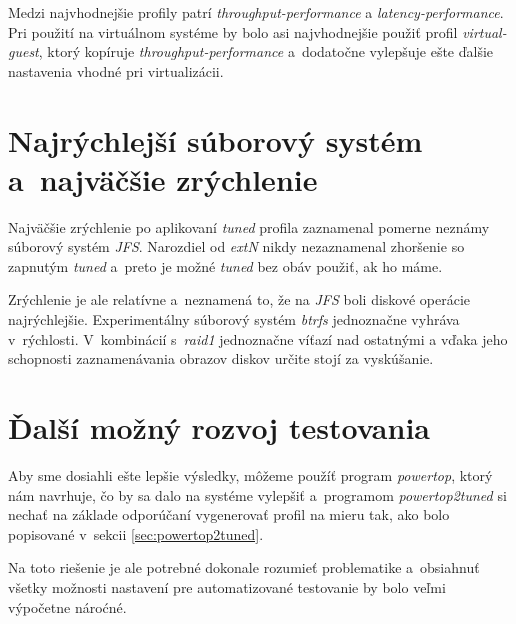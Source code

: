 Medzi najvhodnejšie profily patrí \emph{throughput-performance} a
\emph{latency-performance}. Pri použití na virtuálnom systéme by bolo asi
najvhodnejšie použiť profil \emph{virtual-guest},  ktorý kopíruje
\emph{throughput-performance} a~dodatočne vylepšuje ešte ďalšie nastavenia
vhodné pri virtualizácii.

%
%

\section{Najrýchlejší súborový systém a~najväčšie zrýchlenie}

Najväčšie zrýchlenie po aplikovaní \emph{tuned} profila zaznamenal pomerne
neznámy súborový systém \emph{JFS}. Narozdiel od \emph{extN} nikdy nezaznamenal
zhoršenie so zapnutým \emph{tuned} a~preto je možné \emph{tuned} bez obáv
použiť, ak ho máme.

Zrýchlenie je ale relatívne a~neznamená to, že na \emph{JFS} boli diskové
operácie najrýchlejšie. Experimentálny súborový systém \emph{btrfs} jednoznačne
vyhráva v~rýchlosti. V~kombinácií s~\emph{raid1} jednoznačne víťazí nad
ostatnými a vďaka jeho schopnosti zaznamenávania obrazov diskov určite stojí za
vyskúšanie.

\section{Ďalší možný rozvoj testovania}

Aby sme dosiahli ešte lepšie výsledky, môžeme použíť program \emph{powertop},
ktorý nám navrhuje, čo by sa dalo na systéme vylepšiť a~programom
\emph{powertop2tuned} si nechať na základe odporúčaní vygenerovať profil na
mieru tak, ako bolo popisované v~sekcii \ref{sec:powertop2tuned}.

Na toto riešenie je ale potrebné dokonale rozumieť problematike a~obsiahnuť
všetky možnosti nastavení pre automatizované testovanie by bolo veľmi výpočetne
nároćné.

